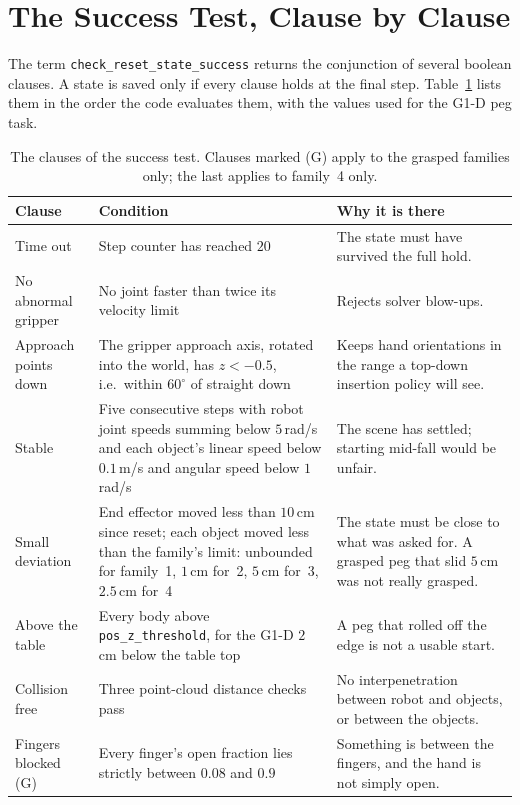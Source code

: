 \documentclass{article}
\newcommand{\code}[1]{\texttt{#1}}
\begin{document}
\section{The Success Test, Clause by Clause}
\label{sec:test}

The term \code{check\_reset\_state\_success} returns the conjunction of several boolean clauses. A state is saved only if every clause holds at the final step. Table~\ref{tab:clauses} lists them in the order the code evaluates them, with the values used for the G1-D peg task.

\begin{table}[t]
\centering
\caption{The clauses of the success test. Clauses marked (G) apply to the grasped families only; the last applies to family~4 only.}
\label{tab:clauses}
\small
\begin{tabular}{@{}p{2.4cm}p{6.0cm}p{4.5cm}@{}}
\toprule
Clause & Condition & Why it is there\\
\midrule
Time out & Step counter has reached $20$ & The state must have survived the full hold.\\
No abnormal gripper & No joint faster than twice its velocity limit & Rejects solver blow-ups.\\
Approach points down & The gripper approach axis, rotated into the world, has $z<-0.5$, i.e.\ within $60^\circ$ of straight down & Keeps hand orientations in the range a top-down insertion policy will see.\\
Stable & Five consecutive steps with robot joint speeds summing below $5$\,rad/s and each object's linear speed below $0.1$\,m/s and angular speed below $1$\,rad/s & The scene has settled; starting mid-fall would be unfair.\\
Small deviation & End effector moved less than $10$\,cm since reset; each object moved less than the family's limit: unbounded for family~1, $1$\,cm for~2, $5$\,cm for~3, $2.5$\,cm for~4 & The state must be close to what was asked for. A grasped peg that slid $5$\,cm was not really grasped.\\
Above the table & Every body above \code{pos\_z\_threshold}, for the G1-D $2$\,cm below the table top & A peg that rolled off the edge is not a usable start.\\
Collision free & Three point-cloud distance checks pass & No interpenetration between robot and objects, or between the objects.\\
Fingers blocked (G) & Every finger's open fraction lies strictly between $0.08$ and $0.9$ & Something is between the fingers, and the hand is not simply open.\\

\end{tabular}
\end{table}
\end{document}
